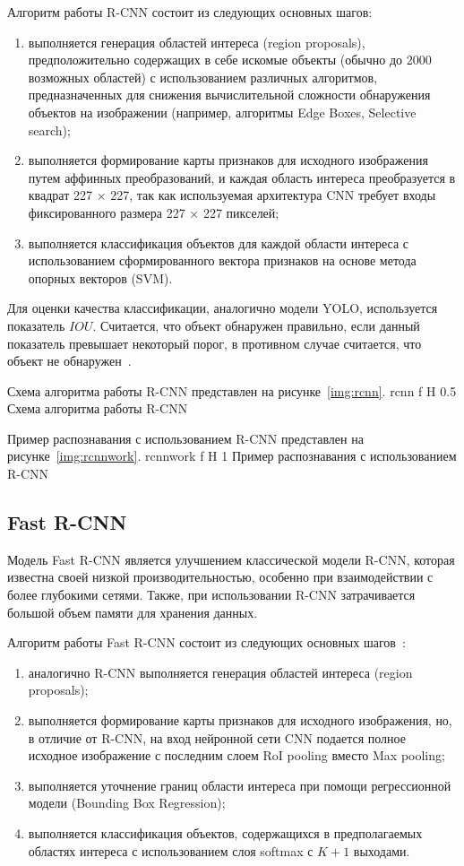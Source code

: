 Алгоритм работы R-CNN состоит из следующих основных шагов:
\begin{enumerate}
	\item выполняется генерация областей интереса (region proposals), предположительно содержащих в себе искомые объекты (обычно до 2000 возможных областей) с использованием различных алгоритмов, предназначенных для снижения вычислительной сложности обнаружения объектов на изображении (например, алгоритмы Edge Boxes, Selective search);
	\item выполняется формирование карты признаков для исходного изображения путем аффинных преобразований, и каждая область интереса преобразуется в квадрат 227 $\times$ 227,	так как используемая архитектура CNN требует входы фиксированного размера 227 $\times$ 227	пикселей;
	\item выполняется классификация объектов для каждой области интереса с использованием сформированного вектора признаков на основе метода опорных векторов (SVM).
\end{enumerate}
Для оценки качества классификации, аналогично модели YOLO, используется показатель $IOU$.
Считается, что объект обнаружен правильно, если данный показатель превышает некоторый порог, в противном случае считается, что объект не обнаружен~\cite{yolochina, rcnn}.

Схема алгоритма работы R-CNN представлен на рисунке~\ref{img:rcnn}.
	{rcnn}
	{f}
	{H}
	{0.5\textwidth}
	{Схема алгоритма работы R-CNN}

Пример распознавания с использованием R-CNN представлен на рисунке~\ref{img:rcnnwork}.
	{rcnnwork}
	{f}
	{H}
	{1\textwidth}
	{Пример распознавания с использованием R-CNN}

\subsection{Fast R-CNN}

Модель Fast R-CNN является улучшением классической модели R-CNN, которая известна своей низкой производительностью, особенно при взаимодействии с более глубокими сетями.
Также, при использовании R-CNN затрачивается большой объем памяти для хранения данных.

Алгоритм работы Fast R-CNN состоит из следующих основных шагов~\cite{yolochina, rcnn}:
\begin{enumerate}
	\item аналогично R-CNN выполняется генерация областей интереса (region proposals);
	\item выполняется формирование карты признаков для исходного изображения, но, в отличие от R-CNN, на вход нейронной сети CNN подается полное исходное изображение с последним слоем RoI pooling вместо Max pooling;
	\item выполняется уточнение границ области интереса при помощи регрессионной модели (Bounding Box Regression);
	\item выполняется классификация объектов, содержащихся в предполагаемых областях интереса с использованием слоя softmax с $K+1$ выходами.
\end{enumerate}

